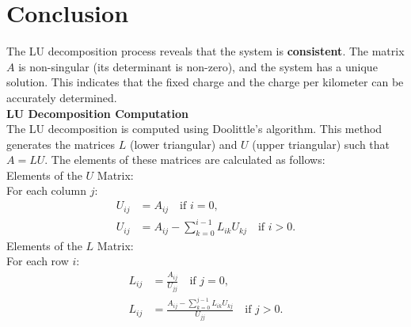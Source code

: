\documentclass[journal]{IEEEtran}
\begin{document}
\section*{Conclusion}
The LU decomposition process reveals that the system is \textbf{consistent}. The matrix \( A \) is non-singular (its determinant is non-zero), and the system has a unique solution. This indicates that the fixed charge and the charge per kilometer can be accurately determined.\\
\textbf{LU Decomposition Computation}\\
The LU decomposition is computed using Doolittle's algorithm. This method generates the matrices \( L \) (lower triangular) and \( U \) (upper triangular) such that \( A = LU \). The elements of these matrices are calculated as follows: \\
Elements of the \( U \) Matrix:  \\
For each column \( j \):
\begin{align}
    U_{ij} &= A_{ij} \quad \text{if } i = 0, \\
    U_{ij} &= A_{ij} - \sum_{k=0}^{i-1} L_{ik} U_{kj} \quad \text{if } i > 0.
\end{align}
Elements of the \( L \) Matrix: \\
For each row \( i \):
\begin{align}
    L_{ij} &= \frac{A_{ij}}{U_{jj}} \quad \text{if } j = 0, \\
    L_{ij} &= \frac{A_{ij} - \sum_{k=0}^{j-1} L_{ik} U_{kj}}{U_{jj}} \quad \text{if } j > 0.
\end{align}
\end{document}
